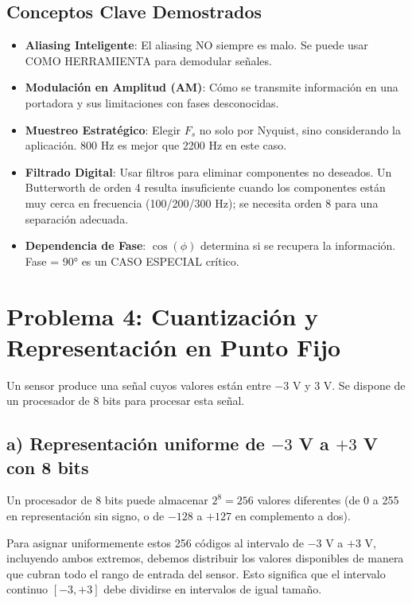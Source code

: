 \documentclass[12pt]{article}
\begin{document}
\subsection*{Conceptos Clave Demostrados}

\begin{itemize}
\item \textbf{Aliasing Inteligente}: El aliasing NO siempre es malo. Se puede usar COMO HERRAMIENTA para demodular señales.

\item \textbf{Modulación en Amplitud (AM)}: Cómo se transmite información en una portadora y sus limitaciones con fases desconocidas.

\item \textbf{Muestreo Estratégico}: Elegir $F_s$ no solo por Nyquist, sino considerando la aplicación. 800 Hz es mejor que 2200 Hz en este caso.

\item \textbf{Filtrado Digital}: Usar filtros para eliminar componentes no deseados. Un Butterworth de orden 4 resulta insuficiente cuando los componentes están muy cerca en frecuencia (100/200/300 Hz); se necesita orden 8 para una separación adecuada.

\item \textbf{Dependencia de Fase}: $\cos(\phi)$ determina si se recupera la información. Fase = 90° es un CASO ESPECIAL crítico.
\end{itemize}


\section{Problema 4: Cuantización y Representación en Punto Fijo}
 
Un sensor produce una señal cuyos valores están entre $-3$ V y $3$ V. Se dispone de un procesador de $8$ bits para procesar esta señal.
 
\subsection*{a) Representación uniforme de $-3$ V a $+3$ V con 8 bits}
 
Un procesador de 8 bits puede almacenar $2^8 = 256$ valores diferentes (de 0 a 255 en representación sin signo, o de $-128$ a $+127$ en complemento a dos).
 
Para asignar uniformemente estos 256 códigos al intervalo de $-3$ V a $+3$ V, incluyendo ambos extremos, debemos distribuir los valores disponibles de manera que cubran todo el rango de entrada del sensor. Esto significa que el intervalo continuo $[-3, +3]$ debe dividirse en intervalos de igual tamaño.
 
\end{document}
